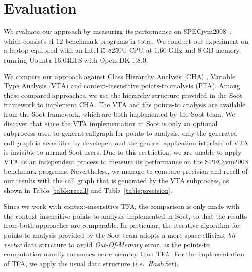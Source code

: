 \documentclass{fac}
\newcommand\ie{\textit{i.e.\ }}
\begin{document}
\section{Evaluation}\label{sec:evaluation}
We evaluate our approach by measuring its performance on SPECjvm2008~\cite{specjvm}, which consists of $12$ benchmark programs in total. We conduct our experiment on a laptop equipped with an Intel i5-8250U CPU at 1.60 GHz and 8 GB memory, running Ubuntu 16.04LTS with OpenJDK 1.8.0.

We compare our approach against Class Hierarchy Analysis (CHA) , Variable Type Analysis (VTA) and context-insensitive points-to analysis (PTA). Among these compared approaches, we use the hierarchy structure provided in the Soot framework to implement CHA. The VTA and the points-to analysis are available from the Soot framework, which are both implemented by the Soot team. We discover that since the VTA implementation in Soot is only an optional subprocess used to generat callgraph for points-to analysis, only the generated call graph is accessible by developer, and the general application interface of VTA is invisible to normal Soot users. Due to this restriction, we are unable to apply VTA as an independent process to measure its performance on the SPECjvm2008 benchmark programs. Nevertheless, we manage to compare precision and recall of our results with the call graph that is generated by the VTA subprocess, as shown in Table~\ref{table:recall} and Table~\ref{table:precision}.

Since we work with context-insensitive TFA, the comparison is only made with the context-insensitive points-to analysis implemented in Soot, so that
the results from both approaches are comparable. In particular, the iterative algorithm for points-to analysis %
provided by the Soot team adopts a more space-efficient \emph{bit vector} data structure to avoid \emph{Out-Of-Memory} error,
as the points-to computation usually consumes more memory than TFA. For the implementation of TFA, we apply the usual data structure (\ie $HashSet$).
%
\end{document}
